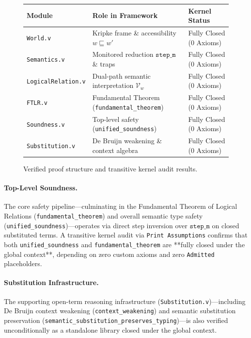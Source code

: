 \begin{figure}[h]
\centering
\small
\begin{tabular}{lll}
\hline
\textbf{Module} & \textbf{Role in Framework} & \textbf{Kernel Status} \\
\hline
\texttt{World.v} & Kripke frame \& accessibility $w \sqsubseteq w'$ & Fully Closed (0 Axioms) \\
\texttt{Semantics.v} & Monitored reduction $\mathtt{step\_m}$ \& traps & Fully Closed (0 Axioms) \\
\texttt{LogicalRelation.v} & Dual-path semantic interpretation $\mathcal{V}_w$ & Fully Closed (0 Axioms) \\
\texttt{FTLR.v} & Fundamental Theorem (\texttt{fundamental\_theorem}) & Fully Closed (0 Axioms) \\
\texttt{Soundness.v} & Top-level safety (\texttt{unified\_soundness}) & Fully Closed (0 Axioms) \\
\texttt{Substitution.v} & De Bruijn weakening \& context algebra & Fully Closed (0 Axioms) \\
\hline
\end{tabular}
\caption{Verified proof structure and transitive kernel audit results.}
\label{fig:proof_architecture}
\end{figure}

\paragraph{Top-Level Soundness.} The core safety pipeline—culminating in the Fundamental Theorem of Logical Relations (\texttt{fundamental\_theorem}) and overall semantic type safety (\texttt{unified\_soundness})—operates via direct step inversion over $\mathtt{step\_m}$ on closed substituted terms. A transitive kernel audit via \texttt{Print Assumptions} confirms that both \texttt{unified\_soundness} and \texttt{fundamental\_theorem} are **fully closed under the global context**, depending on zero custom axioms and zero \texttt{Admitted} placeholders.

\paragraph{Substitution Infrastructure.} The supporting open-term reasoning infrastructure (\texttt{Substitution.v})—including De Bruijn context weakening (\texttt{context\_weakening}) and semantic substitution preservation (\texttt{semantic\_substitution\_preserves\_typing})—is also verified unconditionally as a standalone library closed under the global context.

